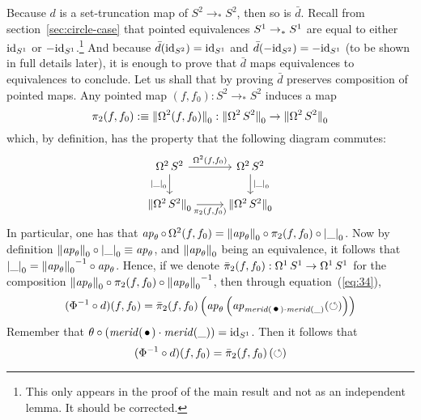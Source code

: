 \documentclass[english,a4]{article}
\newcommand{\Sp}{{S^2}}%
\newcommand{\mrd}{\mathit{merid}}%
\newcommand{\Truncset}[1]{{\Trunc{#1}}_0}%
\newcommand{\truncset}[1]{{\trunc{#1}}_0}%
\newcommand{\ptdto}{\to_\ast}%
\def\blank{\_}%
\begin{document}
Because $d$ is a set-truncation map of $\Sp\ptdto\Sp$, then so is
$\bar d$. Recall from section~\ref{sec:circle-case} that pointed
equivalences $\Sc \ptdto \Sc$ are equal to either $\mathord{\mathrm{id}}_{S^1}$ or
$-\mathord{\mathrm{id}}_{S^1}$.\footnote{\color{red}This only appears in the proof of the
  main result and not as an independent lemma. It should be
  corrected.}  And because $\bar d(\id_\Sp) = \id_\Sc$ and
$\bar d(-\id_\Sp) = -\id_\Sc$ (to be shown in full details later), it
is enough to prove that $\bar d$ maps equivalences to equivalences to
conclude. Let us shall that by proving $\bar d$ preserves composition
of pointed maps. Any pointed map $(f,f_0): \Sp \ptdto \Sp$ induces a
map
\begin{equation}
  \label{eq:33}
  \pi_2(f,f_0)\defequi \Truncset {\loopspace 2 (f,f_0)}: \Truncset{\loopspace 2 \Sp} \to \Truncset{\loopspace 2 \Sp}
\end{equation}
which, by definition, has the property that the following diagram
commutes:
\begin{equation}
  \label{eq:35}
  \begin{tikzcd}
    \loopspace 2 \Sp \rar["{\loopspace 2 (f,f_0)}"]
    \dar["\truncset\blank"swap] & \loopspace 2 \Sp
    \dar["\truncset\blank"]
    \\
    \Truncset{\loopspace 2 \Sp} \rar["{\pi_2 (f,f_0)}"swap] & \Truncset{\loopspace 2 \Sp}
  \end{tikzcd}
\end{equation}
In particular, one has that
$\ap \theta \circ \loopspace 2 (f,f_0) = \Truncset{\ap\theta} \circ
\pi_2(f,f_0) \circ \truncset\blank$. Now by definition
$\Truncset{\ap\theta} \circ \truncset\blank \jdeq \ap \theta$, and
$\Truncset{\ap\theta}$ being an equivalence, it follows that
$\truncset \blank = \inv{\Truncset{\ap\theta}}\circ \ap\theta$. Hence,
if we denote $\bar \pi_2(f,f_0): \mathop{\Omega^{1}} {S^1} \to \mathop{\Omega^{1}} {S^1}$ for the
composition
$\Truncset{\ap\theta} \circ \pi_2(f,f_0) \circ
\inv{\Truncset{\ap\theta}}$, then through equation~(\ref{eq:34}),
\begin{equation}
  \label{eq:36}%
  (\inv\Phi \circ d) (f,f_0) = \bar\pi_2(f,f_0)\left(
    \ap\theta \left( \ap {\mrd(\base) \cdot \mrd(\blank)} (\Sloop) \right)
  \right)
\end{equation}
Remember that $\theta\circ (\mrd(\base)\cdot\mrd(\blank)) =
\id_\Sc$. Then it follows that
\begin{equation}
  \label{eq:36}%
  (\inv\Phi \circ d) (f,f_0) = \bar\pi_2(f,f_0)\left( \Sloop \right)
\end{equation}
\end{document}
